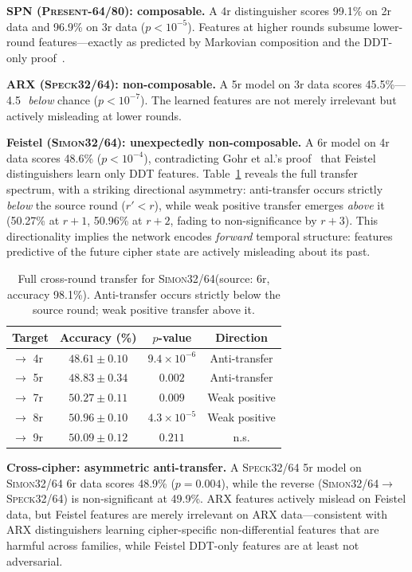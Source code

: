 \documentclass[runningheads]{llncs}
\newcommand{\speck}{\textsc{Speck32/64}\xspace}
\newcommand{\simon}{\textsc{Simon32/64}\xspace}
\newcommand{\present}{\textsc{Present-64/80}\xspace}
\newcommand{\pp}{\,\text{pp}}  %
\begin{document}
\textbf{SPN (\present): composable.}
A 4r distinguisher scores 99.1\% on 2r data and 96.9\% on 3r data ($p < 10^{-5}$).
Features at higher rounds subsume lower-round features---exactly as predicted by Markovian composition and the DDT-only proof~\cite{gohr2022assessment}.

\textbf{ARX (\speck): non-composable.}
A 5r model on 3r data scores 45.5\%---4.5\pp\ \emph{below} chance ($p < 10^{-7}$).
The learned features are not merely irrelevant but actively misleading at lower rounds.

\textbf{Feistel (\simon): unexpectedly non-composable.}
A 6r model on 4r data scores 48.6\% ($p < 10^{-4}$), contradicting Gohr et al.'s proof~\cite{gohr2022assessment} that Feistel distinguishers learn only DDT features.
Table~\ref{tab:simon-full} reveals the full transfer spectrum, with a striking directional asymmetry: anti-transfer occurs strictly \emph{below} the source round ($r' < r$), while weak positive transfer emerges \emph{above} it (50.27\% at $r{+}1$, 50.96\% at $r{+}2$, fading to non-significance by $r{+}3$).
This directionality implies the network encodes \emph{forward} temporal structure: features predictive of the future cipher state are actively misleading about its past.

\begin{table}[t]
\centering
\caption{Full cross-round transfer for \simon (source: 6r, accuracy 98.1\%). Anti-transfer occurs strictly below the source round; weak positive transfer above it.}
\label{tab:simon-full}
\begin{tabular}{@{}lccc@{}}
\toprule
\textbf{Target} & \textbf{Accuracy (\%)} & \textbf{$p$-value} & \textbf{Direction} \\
\midrule
$\to$ 4r & $48.61 \pm 0.10$ & $9.4 \times 10^{-6}$ & Anti-transfer \\
$\to$ 5r & $48.83 \pm 0.34$ & $0.002$ & Anti-transfer \\
$\to$ 7r & $50.27 \pm 0.11$ & $0.009$ & Weak positive \\
$\to$ 8r & $50.96 \pm 0.10$ & $4.3 \times 10^{-5}$ & Weak positive \\
$\to$ 9r & $50.09 \pm 0.12$ & $0.211$ & n.s. \\
\bottomrule
\end{tabular}
\end{table}

\textbf{Cross-cipher: asymmetric anti-transfer.}
A \speck 5r model on \simon 6r data scores 48.9\% ($p = 0.004$), while the reverse (\simon$\to$\speck) is non-significant at 49.9\%.
ARX features actively mislead on Feistel data, but Feistel features are merely irrelevant on ARX data---consistent with ARX distinguishers learning cipher-specific non-differential features that are harmful across families, while Feistel DDT-only features are at least not adversarial.
\end{document}
